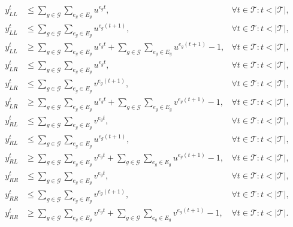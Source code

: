 \begin{align}
   y_{LL}^t &\leq \sum_{g\in\mathcal {G}} \sum_{e_g \in E_g} u^{e_g t}, &\forall t\in\mathcal T:t<|\mathcal T|,\label{eq:yLL-1}\\%
   y_{LL}^t &\leq \sum_{g\in\mathcal {G}} \sum_{e_g \in E_g} u^{e_g (t+1)}, &\forall t\in\mathcal T:t<|\mathcal T|,\\%
   y_{LL}^t &\geq \sum_{g\in\mathcal {G}} \sum_{e_g \in E_g} u^{e_g t} + \sum_{g\in\mathcal {G}} \sum_{e_g \in E_g} u^{e_g (t+1)} -1, &\forall t\in\mathcal T:t<|\mathcal T|,\\%
   y_{LR}^t &\leq \sum_{g\in\mathcal {G}} \sum_{e_g \in E_g} u^{e_g t}, &\forall t\in\mathcal T:t<|\mathcal T|,\\%
   y_{LR}^t &\leq \sum_{g\in\mathcal {G}} \sum_{e_g \in E_g} v^{e_g (t+1)}, &\forall t\in\mathcal T:t<|\mathcal T|,\\%
   y_{LR}^t &\geq \sum_{g\in\mathcal {G}} \sum_{e_g \in E_g} u^{e_g t} + \sum_{g\in\mathcal {G}} \sum_{e_g \in E_g} v^{e_g (t+1)} -1, &\forall t\in\mathcal T:t<|\mathcal T|,\\%
   y_{RL}^t &\leq \sum_{g\in\mathcal {G}} \sum_{e_g \in E_g} v^{e_g t}, &\forall t\in\mathcal T:t<|\mathcal T|,\\%
   y_{RL}^t &\leq \sum_{g\in\mathcal {G}} \sum_{e_g \in E_g} u^{e_g (t+1)}, &\forall t\in\mathcal T:t<|\mathcal T|,\\%
   y_{RL}^t &\geq \sum_{g\in\mathcal {G}} \sum_{e_g \in E_g} v^{e_g t} +\sum_{g\in\mathcal {G}} \sum_{e_g \in E_g} u^{e_g (t+1)} -1, &\forall t\in\mathcal T:t<|\mathcal T|,\\%
   y_{RR}^t &\leq \sum_{g\in\mathcal {G}} \sum_{e_g \in E_g} v^{e_g t}, &\forall t\in\mathcal T:t<|\mathcal T|,\\%
   y_{RR}^t &\leq \sum_{g\in\mathcal {G}} \sum_{e_g \in E_g} v^{e_g (t+1)}, &\forall t\in\mathcal T:t<|\mathcal T|,\\%
   y_{RR}^t &\geq \sum_{g\in\mathcal {G}} \sum_{e_g \in E_g}v^{e_g t} +\sum_{g\in\mathcal {G}} \sum_{e_g \in E_g} v^{e_g (t+1)} -1,  &\forall t\in\mathcal T:t<|\mathcal T|.\label{eq:yRR-3}%
\end{align}


